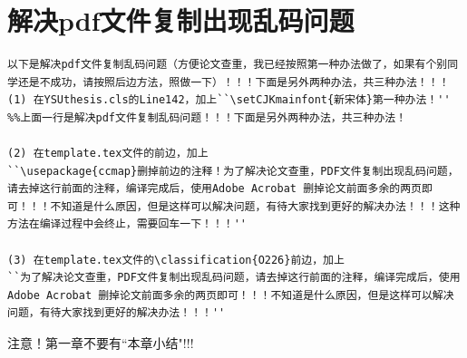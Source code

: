 \section{解决pdf文件复制出现乱码问题}\label{section1-4}
\begin{verbatim}
以下是解决pdf文件复制乱码问题（方便论文查重，我已经按照第一种办法做了，如果有个别同学还是不成功，请按照后边方法，照做一下）！！！下面是另外两种办法，共三种办法！！！
(1) 在YSUthesis.cls的Line142，加上``\setCJKmainfont{新宋体}第一种办法！''
%%上面一行是解决pdf文件复制乱码问题！！！下面是另外两种办法，共三种办法！

(2) 在template.tex文件的前边，加上
``\usepackage{ccmap}删掉前边的注释！为了解决论文查重，PDF文件复制出现乱码问题，请去掉这行前面的注释，编译完成后，使用Adobe Acrobat 删掉论文前面多余的两页即可！！！不知道是什么原因，但是这样可以解决问题，有待大家找到更好的解决办法！！！这种方法在编译过程中会终止，需要回车一下！！！''

(3) 在template.tex文件的\classification{O226}前边，加上
``为了解决论文查重，PDF文件复制出现乱码问题，请去掉这行前面的注释，编译完成后，使用Adobe Acrobat 删掉论文前面多余的两页即可！！！不知道是什么原因，但是这样可以解决问题，有待大家找到更好的解决办法！！！''
\end{verbatim}

注意！第一章不要有``本章小结"!!!

